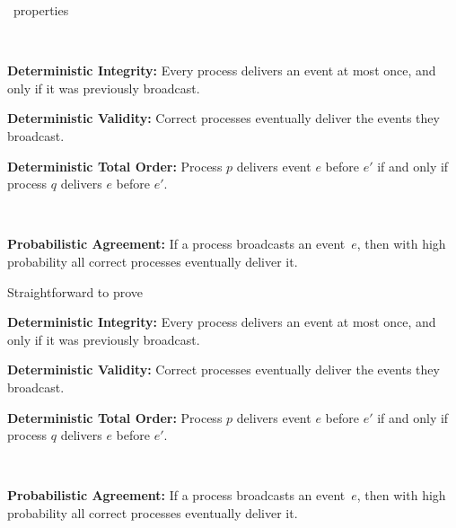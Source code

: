 \begin{frame}{\EPTO\ properties}
 
{
\mbox{\ }\vspace{-1mm}
\begin{mdframed}[linecolor=white]

 \hangindent=10pt \textbf{Deterministic Integrity:} 
Every process delivers an event at most once, and only if it was previously broadcast. \medskip
  
\hangindent=10pt \textbf{Deterministic Validity:} Correct processes eventually deliver the events they broadcast. \medskip

  \hangindent=10pt \textbf{Deterministic Total Order:} Process $p$ delivers event $e$ before $e'$ if and only if process $q$ delivers $e$ before $e'$. 
\end{mdframed}

\vspace{5.8mm}

\mbox{\ }\vspace{-2mm}
\begin{mdframed}[linecolor=white]
    \hangindent=10pt \textbf{Probabilistic Agreement:} If a process broadcasts an event~$e$, then with high probability all correct processes eventually deliver it.
  \end{mdframed}
}  


{

Straightforward to prove
\vspace{-2mm}
\begin{mdframed}

 \hangindent=10pt \textbf{Deterministic Integrity:} 
Every process delivers an event at most once, and only if it was previously broadcast. \medskip
  
\hangindent=10pt \textbf{Deterministic Validity:} Correct processes eventually deliver the events they broadcast. \medskip

  \hangindent=10pt \textbf{Deterministic Total Order:} Process $p$ delivers event $e$ before $e'$ if and only if process $q$ delivers $e$ before $e'$. 
\end{mdframed}

\vspace{5.8mm}

\mbox{\ \tc{\ }}
\vspace{-2mm}
 \begin{mdframed}[linecolor=white]
    \hangindent=10pt \textbf{Probabilistic Agreement:} If a process broadcasts an event~$e$, then with high probability all correct processes eventually deliver it.
  \end{mdframed}
}  



\end{frame}
